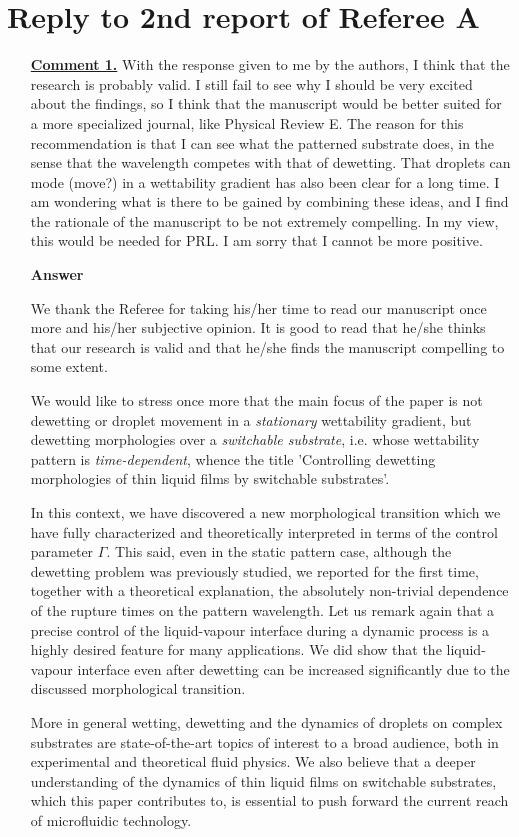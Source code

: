 \documentclass[12pt,english]{article}
\begin{document}

\section*{Reply to 2nd report of Referee A}
\begin{itemize}  
\item[ \textbf{\underline{Comment 1.}}]
{ 
With the response given to me by the authors, I think that the
research is probably valid. I still fail to see why I should be very
excited about the findings, so I think that the manuscript would be
better suited for a more specialized journal, like Physical Review E.
The reason for this recommendation is that I can see what the
patterned substrate does, in the sense that the wavelength competes
with that of dewetting. That droplets can mode (move?) in a wettability
gradient has also been clear for a long time. I am wondering what is
there to be gained by combining these ideas, and I find the rationale
of the manuscript to be not extremely compelling. In my view, this
would be needed for PRL. I am sorry that I cannot be more positive.
}

\item[ \textbf{{Answer}}]
{
We thank the Referee for taking his/her time to read our 
manuscript once more and his/her subjective opinion. It is good to read 
that he/she thinks that our research is valid and that he/she finds the 
manuscript compelling to some extent. 

We would like to stress once more that 
the main focus of the paper is not dewetting or droplet movement in a {\it stationary} wettability gradient, but dewetting 
morphologies over a {\it switchable substrate}, i.e. whose wettability pattern 
is {\it time-dependent}, whence the title 'Controlling dewetting morphologies of 
thin liquid films by switchable substrates'.

In this context, we have discovered a new morphological transition which we have fully characterized 
and theoretically interpreted in terms of the control parameter $\Gamma$.
This said, even in the static pattern case, although the dewetting problem was previously studied, we 
reported for the first time, together with a theoretical explanation, the absolutely non-trivial dependence of the rupture times on the pattern wavelength.
Let us remark again that a precise control of the liquid-vapour interface during a dynamic process is a highly desired feature for many applications. We did show that the liquid-vapour 
interface even after dewetting can be increased significantly due to
the discussed morphological transition. 

More in general wetting, dewetting and the dynamics of droplets on complex substrates 
are state-of-the-art topics of interest to a broad audience, both in experimental and 
theoretical fluid physics. 
We also believe that a deeper understanding of the dynamics of thin liquid films on switchable 
substrates, which this paper contributes to, is essential to push forward the current reach of microfluidic technology.
}
\end{itemize}  
\end{document}
